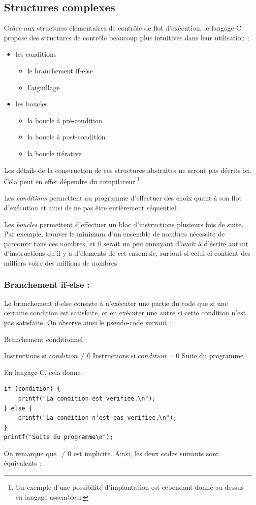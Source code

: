 \documentclass[../../../main.tex]{subfiles}
\begin{document}
\subsection{Structures complexes}
Grâce aux structures élémentaires de contrôle de flot d'exécution, le langage C propose des structures de contrôle beaucoup plus intuitives dans leur utilisation :
\begin{itemize}
	\item les conditions
	\begin{itemize}
	\item le branchement \textsf{if-else}
	\item l'aiguillage
	\end{itemize}
	\item les boucles
	\begin{itemize}
		\item la boucle à pré-condition
		\item la boucle à post-condition
		\item la boucle itérative
	\end{itemize}
\end{itemize}
Les détails de la construction de ces structures abstraites ne seront pas décrits ici. Cela peut en effet dépendre du compilateur.\footnote{Un exemple d'une possibilité d'implantation est cependant donné au dessus en langage assembleur}

Les \textit{conditions} permettent au programme d'effectuer des choix quant à son flot d'exécution et ainsi de ne pas être entièrement séquentiel.

Les \textit{boucles} permettent d'effectuer un bloc d'instructions plusieurs fois de suite. Par exemple, trouver le minimum d'un ensemble de nombres nécessite de parcourir tous ces nombres, et il serait un peu ennuyant d'avoir à d'écrire autant d'instructions qu'il y a d'éléments de cet ensemble, surtout si celui-ci contient des milliers voire des millions de nombres.
\subsubsection{Branchement \textsf{if-else} :}
 
Le branchement \textsf{if-else} consiste à n'exécuter une partie du code que si une certaine condition est satisfaite, et en exécuter une autre si cette condition n'est pas satisfaite. On observe ainsi le pseudo-code suivant :
\begin{algorithm}
\caption{Branchement conditionnel}
 {
	Instructions si $condition \neq{0}$
} {
	Instructions si $condition = 0$
}
Suite du programme
\end{algorithm}
En langage C, cela donne :
\begin{verbatim}
if (condition) {
	printf("La condition est verifiee.\n");
} else {
	printf("La condition n'est pas verifiee.\n");
}
printf("Suite du programme\n");
\end{verbatim}
On remarque que $\neq{0}$ est implicite. Ainsi, les deux codes suivants sont équivalents :
\end{document}
